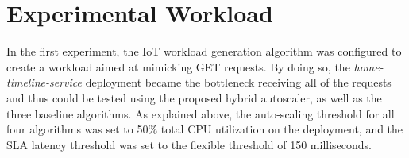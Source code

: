 \section{Experimental Workload}
\label{sec:ch6-exp-workload}

In the first experiment, the IoT workload generation algorithm was configured to create a workload aimed at mimicking GET requests. By doing so, the \textit{home-timeline-service} deployment became the bottleneck receiving all of the requests and thus could be tested using the proposed hybrid autoscaler, as well as the three baseline algorithms. As explained above, the auto-scaling threshold for all four algorithms was set to 50\% total CPU utilization on the deployment, and the SLA latency threshold was set to the flexible threshold of 150 milliseconds.\par

\begin{center}
\begin{minipage}{\linewidth}
    \label{fig:exp1-workload}
\end{minipage}
\end{center}

